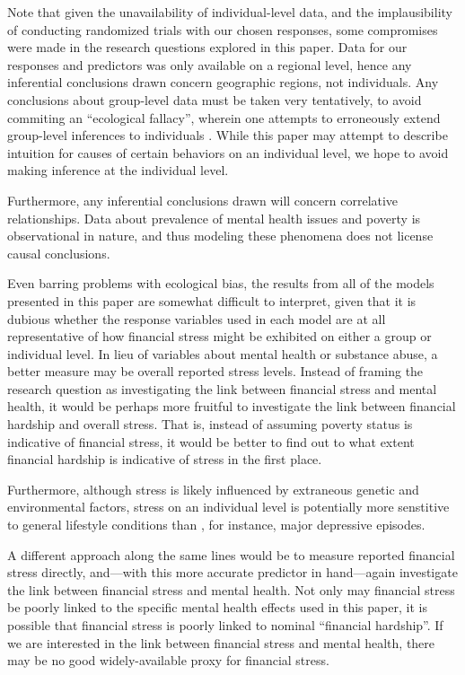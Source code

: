 \documentclass{article}
\begin{document}
Note that given the unavailability of individual-level data,
and the implausibility of conducting randomized trials with our chosen responses,
some compromises were made in the research questions explored in this paper.
Data for our responses and predictors was only available on a regional level,
hence any inferential conclusions drawn
concern geographic regions, not individuals.
Any conclusions about group-level data must be taken very tentatively,
to avoid commiting an ``ecological fallacy'',
wherein one attempts to erroneously extend group-level inferences
to individuals
\cite{piantadosi_1988}.
While this paper may attempt to describe
intuition for causes of certain behaviors on an individual
level, we hope to avoid making inference at the individual level.

Furthermore, any inferential conclusions drawn will concern correlative
relationships.
Data about prevalence of mental health issues and poverty is observational
in nature, and thus modeling these phenomena does not license causal
conclusions.

Even barring problems with ecological bias,
the results from all of the models presented in this paper
are somewhat difficult to interpret,
given that it is dubious whether the response variables
used in each model are at all representative
of how financial stress might be exhibited
on either a group or individual level.
In lieu of variables about mental health or substance abuse,
a better measure may be overall reported stress levels.
Instead of framing the research question as investigating
the link between financial stress and mental health,
it would be perhaps more fruitful to investigate
the link between financial hardship
and overall stress.
That is, instead of assuming poverty status
is indicative of financial stress,
it would be better to find out to what extent
financial hardship is indicative of stress
in the first place.

Furthermore, although stress is likely influenced by
extraneous genetic and environmental factors,
stress on an individual level is potentially more
senstitive to general lifestyle conditions than
, for instance,
major depressive episodes.

A different approach along the same lines would be
to measure reported financial stress directly,
and---with this more accurate predictor in hand---again
investigate the link between financial stress
and mental health.
Not only may financial stress be poorly linked to
the specific mental health effects used in this paper,
it is possible that financial stress is poorly linked
to nominal ``financial hardship''.
If we are interested in the link between financial stress and mental health,
there may be no good widely-available proxy for financial stress.
\end{document}
